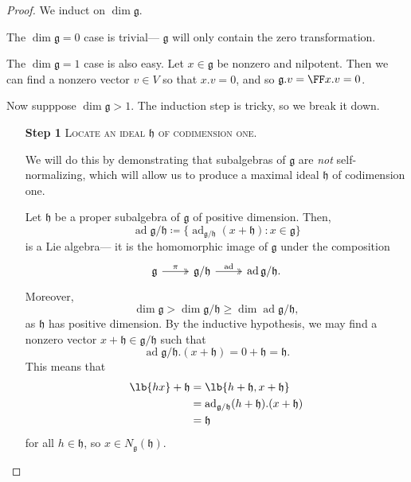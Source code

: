 \documentclass{article}
\DeclarePairedDelimiter\lb\lbrack\rbrack
\newcommand*\ad{\operatorname{ad}}
\newcommand*\frkg{{\ensuremath{\mathfrak{g}}}}
\newcommand*\frkh{{\ensuremath{\mathfrak{h}}}}
\newcommand*\acts{.}
\begin{document}
\begin{proof}
    We induct on $\dim \frkg$.

    The $\dim \frkg = 0$ case is trivial--- $\frkg$ will only contain the zero transformation.

    The $\dim \frkg = 1$ case is also easy.
    Let $x \in \frkg$ be nonzero and nilpotent.
    Then  we can find a nonzero vector $v \in V$ so that $x \acts v = 0$, and so $\frkg \acts v = \FF x \acts v = 0$.

    Now supppose $\dim \frkg > 1$.
    The induction step is tricky, so we break it down.
    \begin{itemize}
        \item[\textbf{Step 1}] 
            \textsc{\color{Crimson} Locate an ideal $\frkh$ of codimension one.}

            We will do this by demonstrating that subalgebras of $\frkg$ are \textit{not} self-normalizing, which will allow us to produce a maximal ideal $\frkh$ of codimension one.

            Let $\frkh$ be a proper subalgebra of $\frkg$ of positive dimension.
            Then,
            \[
                \ad \frkg/\frkh
                \coloneq
                \Big\{
                    \ad_{\frkg/\frkh}(x + \frkh)
                    :
                    x \in \frkg
                \Big\}
            \]
            is a Lie algebra--- it is the homomorphic image of $\frkg$ under the composition
            \[
                \begin{tikzcd}
                    \frkg \arrow[r, "\pi", two heads] & \frkg/\frkh \arrow[r, "\ad", two heads] & \ad \frkg/\frkh. 
                \end{tikzcd}
            \]
            Moreover, 
            \[
                \dim \frkg > \dim \frkg/\frkh \geq \dim \ad \frkg/\frkh,
            \]
            as $\frkh$ has positive dimension.
            By the inductive hypothesis, we may find a nonzero vector $x + \frkh \in \frkg/\frkh$ such that
            \[
                \ad \frkg/\frkh \acts (x + \frkh) 
                = 
                0 + \frkh = \frkh.
            \]
            This means that
            \begin{align*}
                \lb{hx} + \frkh
                &=
                \lb{h + \frkh, x + \frkh}
                \\
                &=
                \ad_{\frkg/\frkh} (h + \frkh) \acts (x + \frkh) 
                \\
                &= 
                \frkh
            \end{align*}
            for all $h \in \frkh$, so $x \in N_\frkg(\frkh)$.


\end{itemize}
\end{proof}
\end{document}
